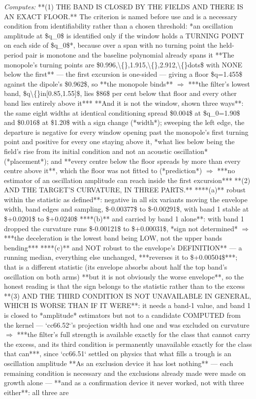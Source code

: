 \begin{description}
\emph{Computes:}  **(1) THE BAND IS CLOSED BY THE FIELDS AND THERE IS AN EXACT FLOOR.** The criterion is named before use and is a necessary condition from identifiability rather than a chosen threshold: *an oscillation amplitude at \$q\_0\$ is identified only if the window holds a TURNING POINT on each side of \$q\_0\$*, because over a span with no turning point the held-period pair is monotone and the baseline polynomial already spans it  **The monopole's turning points are \$0.996,\textbackslash\{\},1.915,\textbackslash\{\},2.912,\textbackslash\{\}dots\$ with NONE below the first** --- the first excursion is one-sided --- giving a floor \$q=1.455\$ against the dipole's \$0.962\$, so **the monopole binds** \ensuremath{\Rightarrow} ***the filter's lowest band, \$q\textbackslash\{\}in[0.85,1.55]\$, lies \$86\$ per cent below that floor and every other band lies entirely above it***  **And it is not the window, shown three ways**: the same eight widths at identical conditioning spread \$0.004\$ at \$q\_0=1.90\$ and \$0.016\$ at \$1.20\$ with a sign change (*width*); sweeping the left edge, the departure is negative for every window opening past the monopole's first turning point and positive for every one staying above it, *what lies below being the field's rise from its initial condition and not an acoustic oscillation* (*placement*); and **every centre below the floor spreads by more than every centre above it**, which the floor was not fitted to (*prediction*) \ensuremath{\Rightarrow} ***no estimator of an oscillation amplitude can reach inside the first excursion***   **(2) AND THE TARGET'S CURVATURE, IN THREE PARTS.**  ****(a)** robust within the statistic as defined**: negative in all six variants moving the envelope width, band edges and sampling, \$-0.00377\$ to \$-0.00291\$, with band 1 stable at \$+0.0201\$ to \$+0.0240\$  ****(b)** and carried by band 1 alone**: with band 1 dropped the curvature runs \$-0.00121\$ to \$+0.00031\$, *sign not determined* \ensuremath{\Rightarrow} ***the deceleration is the lowest band being LOW, not the upper bands bending***  ****(c)** and NOT robust to the envelope's DEFINITION** --- a running median, everything else unchanged, ***reverses it to \$+0.00504\$***; that is a different statistic (its envelope absorbs about half the top band's oscillation on both arms) **but it is not obviously the worse envelope**, so the honest reading is that the sign belongs to the statistic rather than to the excess   **(3) AND THE THIRD CONDITION IS NOT UNAVAILABLE IN GENERAL, WHICH IS WORSE THAN IF IT WERE**: it needs a band-1 value, and band 1 is closed to *amplitude* estimators but not to a candidate COMPUTED from the kernel --- `cc66.52`'s projection width had one and was excluded on curvature \ensuremath{\Rightarrow} ***the filter's full strength is available exactly for the class that cannot carry the excess, and its third condition is permanently unavailable exactly for the class that can***, since `cc66.51` settled on physics that what fills a trough is an oscillation amplitude  **As an exclusion device it has lost nothing** --- each remaining condition is necessary and the exclusions already made were made on growth alone --- **and as a confirmation device it never worked, not with three either**: all three are 
\end{description}
